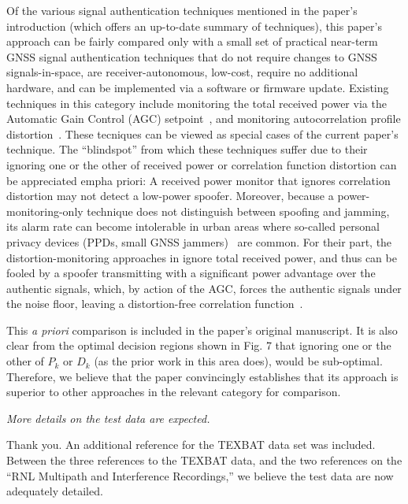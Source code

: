 \documentclass[12pt]{report}
\begin{document}
  
   Of the various signal authentication techniques mentioned in the
    paper's introduction (which offers an up-to-date summary of techniques),
    this paper's approach can be fairly compared only with a small set of
    practical near-term GNSS signal authentication techniques that do not
    require changes to GNSS signals-in-space, are receiver-autonomous,
    low-cost, require no additional hardware, and can be implemented via a
    software or firmware update. Existing techniques in this category include
    monitoring the total received power via the Automatic Gain Control (AGC)
    setpoint~\cite{akos2012s}, and monitoring autocorrelation profile
    distortion~\cite{ledvina2010cgr, cavaleri2010dscc, huang2016gnss}.  These
    tecniques can be viewed as special cases of the current paper's technique.
    The ``blindspot'' from which these techniques suffer due to their ignoring
    one or the other of received power or correlation function distortion can
    be appreciated emph{a priori}: A received power monitor that ignores
    correlation distortion may not detect a low-power spoofer. Moreover,
    because a power-monitoring-only technique does not distinguish between
    spoofing and jamming, its alarm rate can become intolerable in urban areas
    where so-called personal privacy devices (PPDs, small GNSS
    jammers)~\cite{mitch2012kyejam} are common.  For their part, the
    distortion-monitoring approaches in \cite{ledvina2010cgr,
      cavaleri2010dscc, huang2016gnss} ignore total received power, and thus
    can be fooled by a spoofer transmitting with a significant power advantage
    over the authentic signals, which, by action of the AGC, forces the
    authentic signals under the noise floor, leaving a distortion-free
    correlation function~\cite{humphreys2011ds}.

    This \emph{a priori} comparison is included in the paper's original
    manuscript.  It is also clear from the optimal decision regions shown in
    Fig. 7 that ignoring one or the other of $P_k$ or $D_k$ (as the prior work
    in this area does), would be sub-optimal.  Therefore, we believe that the
    paper convincingly establishes that its approach is superior to other
    approaches in the relevant category for comparison.
  

  
  
{\textit{More details on the test data are expected.}}

  
  {{Thank you. An additional reference for the TEXBAT data set was
        included.  Between the three references to the TEXBAT data, and the
        two references on the ``RNL Multipath and Interference Recordings,''
        we believe the test data are now adequately detailed.}}
  
\end{document}
